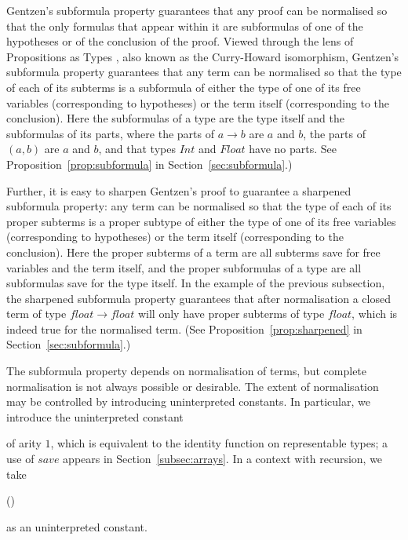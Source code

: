 \documentclass[authoryear,9pt]{sigplanconf}
\newcommand{\Conid}[1]{\mathit{#1}}
\newcommand{\Varid}[1]{\mathit{#1}}
\def\resethooks{%
  \global\let\SaveRestoreHook\empty
  \global\let\ColumnHook\empty}
\let\hspre\empty
\let\hspost\empty
\begin{document}
Gentzen's subformula property guarantees that any proof can be
normalised so that the only formulas that appear within it are
subformulas of one of the hypotheses or of the conclusion of the
proof.  Viewed through the lens of Propositions as Types
\citep{Howard-1980,Wadler-2015}, also known as the Curry-Howard
isomorphism, Gentzen's subformula property guarantees that any term
can be normalised so that the type of each of its subterms is a
subformula of either the type of one of its free variables (corresponding
to hypotheses) or the term itself (corresponding to the conclusion).
Here the subformulas of a type are the type itself and the subformulas of
its parts, where the parts of \ensuremath{\Varid{a}\to \Varid{b}} are \ensuremath{\Varid{a}} and \ensuremath{\Varid{b}}, the parts of
\ensuremath{(\Varid{a},\Varid{b})} are \ensuremath{\Varid{a}} and \ensuremath{\Varid{b}}, and that types \ensuremath{\Conid{Int}} and \ensuremath{\Conid{Float}} have no
parts.
See Proposition~\ref{prop:subformula} in Section~\ref{sec:subformula}.)


Further, it is easy to sharpen Gentzen's proof to guarantee a
sharpened subformula property: any term can be normalised so that the
type of each of its proper subterms is a proper subtype of either the
type of one of its free variables (corresponding to hypotheses) or the
term itself (corresponding to the conclusion).  Here the proper
subterms of a term are all subterms save for free variables and the
term itself, and the proper subformulas of a type are all subformulas
save for the type itself.  In the example of the previous subsection,
the sharpened subformula property guarantees that after normalisation
a closed term of type \ensuremath{\Varid{float}\to \Varid{float}} will only have proper subterms
of type \ensuremath{\Varid{float}}, which is indeed true for the normalised term.
(See Proposition~\ref{prop:sharpened} in Section~\ref{sec:subformula}.)

The subformula property depends on normalisation of terms, but
complete normalisation is not always possible or desirable.  The
extent of normalisation may be controlled by introducing uninterpreted
constants.  In particular, we introduce the uninterpreted constant
\begin{hscode}\SaveRestoreHook
\column{B}{@{}>{\hspre}l<{\hspost}@{}}%
\column{E}{@{}>{\hspre}l<{\hspost}@{}}%
\>[B]{}\Varid{save}\mathbin{::}\Conid{Rep}\;\Varid{a}\Rightarrow \Varid{a}\to \Varid{a}{}\<[E]%
\ColumnHook
\end{hscode}\resethooks
of arity $1$, which is equivalent to the identity function
on representable types; a use of \ensuremath{\Varid{save}} appears in
Section~\ref{subsec:arrays}.
In a context with recursion, we take 
\begin{hscode}\SaveRestoreHook
\column{B}{@{}>{\hspre}l<{\hspost}@{}}%
\column{E}{@{}>{\hspre}l<{\hspost}@{}}%
\>[B]{}\Varid{fix}\mathbin{::}(\Varid{a}\to \Varid{a})\to \Varid{a}{}\<[E]%
\ColumnHook
\end{hscode}\resethooks
as an uninterpreted constant.
\end{document}
